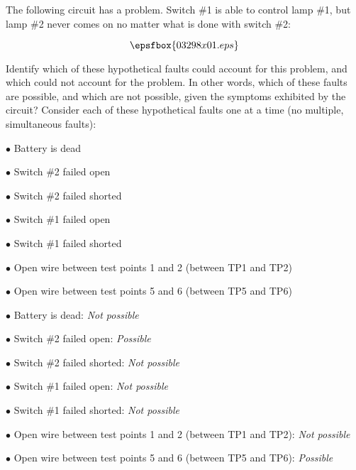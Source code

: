 

The following circuit has a problem.  Switch \#1 is able to control lamp \#1, but lamp \#2 never comes on no matter what is done with switch \#2:

$$\epsfbox{03298x01.eps}$$

\goodbreak
Identify which of these hypothetical faults could account for this problem, and which could not account for the problem.  In other words, which of these faults are possible, and which are not possible, given the symptoms exhibited by the circuit?  Consider each of these hypothetical faults one at a time (no multiple, simultaneous faults):

\medskip
\item{$\bullet$} Battery is dead
\item{$\bullet$} Switch \#2 failed open
\item{$\bullet$} Switch \#2 failed shorted
\item{$\bullet$} Switch \#1 failed open
\item{$\bullet$} Switch \#1 failed shorted
\item{$\bullet$} Open wire between test points 1 and 2 (between TP1 and TP2)
\item{$\bullet$} Open wire between test points 5 and 6 (between TP5 and TP6)
\medskip







\medskip
\item{$\bullet$} Battery is dead: {\it Not possible}
\item{$\bullet$} Switch \#2 failed open: {\it Possible}
\item{$\bullet$} Switch \#2 failed shorted: {\it Not possible}
\item{$\bullet$} Switch \#1 failed open: {\it Not possible}
\item{$\bullet$} Switch \#1 failed shorted: {\it Not possible}
\item{$\bullet$} Open wire between test points 1 and 2 (between TP1 and TP2): {\it Not possible}
\item{$\bullet$} Open wire between test points 5 and 6 (between TP5 and TP6): {\it Possible}
\medskip

